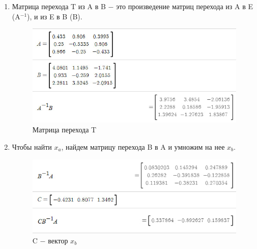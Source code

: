 \begin{enumerate}
    \item 
        Матрица перехода T из A в B $-$ это произведение матриц перехода из A в E (A$^{-1}$), и из E в B (B).\\
        \begin{figure}[H]
            \centering
            \includegraphics[width=0.6\linewidth]{images/2_ABT}
            \caption{Матрица перехода T}
        \end{figure}

    \item Чтобы найти $x_a$, найдем матрицу перехода B в A и умножим на нее $x_b$.\\
        \begin{figure}[H]
            \centering
            \includegraphics[width=0.6\linewidth]{images/2_xBAT}
            \caption{C $-$ вектор $x_b$}
        \end{figure}


\end{enumerate}
